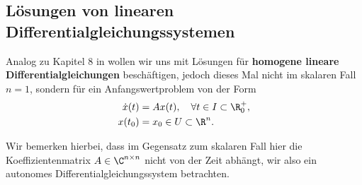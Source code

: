 \documentclass[letterpaper,10pt,german]{jupyterBook}
\begin{document}
\subsection{Lösungen von linearen Differentialgleichungssystemen}
\label{\detokenize{ode/repetition:losungen-von-linearen-differentialgleichungssystemen}}\label{\detokenize{ode/repetition:s-lineare-dglsysteme}}
\par
Analog zu Kapitel 8 in \cite{Ten21} wollen wir uns mit Lösungen für \textbf{homogene lineare Differentialgleichungen} beschäftigen, jedoch dieses Mal nicht im skalaren Fall \(n=1\), sondern für ein Anfangswertproblem von der Form
\begin{align}\label{equation:ode/repetition:eq:linhomdglsystem}
\dot{x}(t) &= A x(t), \quad \forall t \in I \subset \R^+_0, \\
x(t_0) &= x_0 \in U \subset \R^n.
\end{align}
\par
Wir bemerken hierbei, dass im Gegensatz zum skalaren Fall hier die Koeffizientenmatrix \(A \in \C^{n\times n}\) nicht von der Zeit abhängt, wir also ein autonomes Differentialgleichungssystem betrachten.
\end{document}
